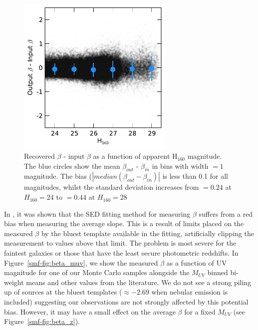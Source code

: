 \begin{figure}
\centering
\includegraphics[width=75mm]{plots/figB1.pdf}
\caption[Recovered $\beta$ - input $\beta$ as a function of apparent H$_{160}$ magnitude.]{Recovered $\beta$ - input $\beta$ as a function of apparent H$_{160}$ magnitude. The blue circles show the mean $\beta_{out}$ - $\beta_{in}$ in bins with width $=1$ magnitude. The bias ($\left | median (\beta_{out}-\beta_{in}) \right |$ is less than 0.1 for all magnitudes, whilst the standard deviation increases from $= 0.24$ at $H_{160} = 24$ to $= 0.44$ at $H_{160} = 28$}
\label{smf-fig:betacomparison}
\end{figure}

In \citet{2013MNRAS.429.2456R}, it was shown that the SED fitting method for measuring $\beta$ suffers from a red bias when measuring the average slope. This is a result of limits placed on the measured $\beta$ by the bluest template available in the fitting, artificially clipping the measurement to values above that limit. The problem is most severe for the faintest galaxies or those that have the least secure photometric redshifts. In Figure~\ref{smf-fig:beta_muv}, we show the measured $\beta$ as a function of UV magnitude for one of our Monte Carlo samples alongside the $M_{UV}$ binned bi-weight means and other values from the literature. We do not see a strong piling up of sources at the bluest templates ($\approx -2.69$ when nebular emission is included) suggesting our observations are not strongly affected by this potential bias. However, it may have a small effect on the average $\beta$ for a fixed $M_{UV}$ (see Figure~\ref{smf-fig:beta_z}).

